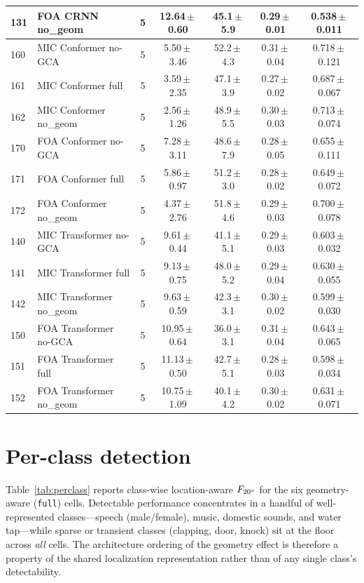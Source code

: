 \begin{table}[t]
{\begin{tabular}{llccccc}
131 & FOA CRNN no\_geom     & 5 & 12.64\,$\pm$\,0.60 & 45.1\,$\pm$\,5.9 & 0.29\,$\pm$\,0.01 & 0.538\,$\pm$\,0.011 \\
\midrule
160 & MIC Conformer no-GCA  & 5 & 5.50\,$\pm$\,3.46 & 52.2\,$\pm$\,4.3 & 0.31\,$\pm$\,0.04 & 0.718\,$\pm$\,0.121 \\
161 & MIC Conformer full    & 5 & 3.59\,$\pm$\,2.35 & 47.1\,$\pm$\,3.9 & 0.27\,$\pm$\,0.02 & 0.687\,$\pm$\,0.067 \\
162 & MIC Conformer no\_geom & 5 & 2.56\,$\pm$\,1.26 & 48.9\,$\pm$\,5.5 & 0.30\,$\pm$\,0.03 & 0.713\,$\pm$\,0.074 \\
170 & FOA Conformer no-GCA  & 5 & 7.28\,$\pm$\,3.11 & 48.6\,$\pm$\,7.9 & 0.28\,$\pm$\,0.05 & 0.655\,$\pm$\,0.111 \\
171 & FOA Conformer full    & 5 & 5.86\,$\pm$\,0.97 & 51.2\,$\pm$\,3.0 & 0.28\,$\pm$\,0.02 & 0.649\,$\pm$\,0.072 \\
172 & FOA Conformer no\_geom & 5 & 4.37\,$\pm$\,2.76 & 51.8\,$\pm$\,4.6 & 0.29\,$\pm$\,0.03 & 0.700\,$\pm$\,0.078 \\
\midrule
140 & MIC Transformer no-GCA  & 5 & 9.61\,$\pm$\,0.44 & 41.1\,$\pm$\,5.1 & 0.29\,$\pm$\,0.03 & 0.603\,$\pm$\,0.032 \\
141 & MIC Transformer full    & 5 & 9.13\,$\pm$\,0.75 & 48.0\,$\pm$\,5.2 & 0.29\,$\pm$\,0.04 & 0.630\,$\pm$\,0.055 \\
142 & MIC Transformer no\_geom & 5 & 9.63\,$\pm$\,0.59 & 42.3\,$\pm$\,3.1 & 0.30\,$\pm$\,0.02 & 0.599\,$\pm$\,0.030 \\
150 & FOA Transformer no-GCA  & 5 & 10.95\,$\pm$\,0.64 & 36.0\,$\pm$\,3.1 & 0.31\,$\pm$\,0.04 & 0.643\,$\pm$\,0.065 \\
151 & FOA Transformer full    & 5 & 11.13\,$\pm$\,0.50 & 42.7\,$\pm$\,5.1 & 0.28\,$\pm$\,0.03 & 0.598\,$\pm$\,0.034 \\
152 & FOA Transformer no\_geom & 5 & 10.75\,$\pm$\,1.09 & 40.1\,$\pm$\,4.2 & 0.30\,$\pm$\,0.02 & 0.631\,$\pm$\,0.071 \\
\bottomrule
\end{tabular}%
}
\end{table}

\section{Per-class detection}
\label{sec:appendix_perclass}
Table~\ref{tab:perclass} reports class-wise location-aware $F_{20^\circ}$ for
the six geometry-aware (\texttt{full}) cells. Detectable performance
concentrates in a handful of well-represented classes---speech (male/female),
music, domestic sounds, and water tap---while sparse or transient classes
(clapping, door, knock) sit at the floor across \emph{all} cells. The
architecture ordering of the geometry effect is therefore a property of the
shared localization representation rather than of any single class's
detectability.

